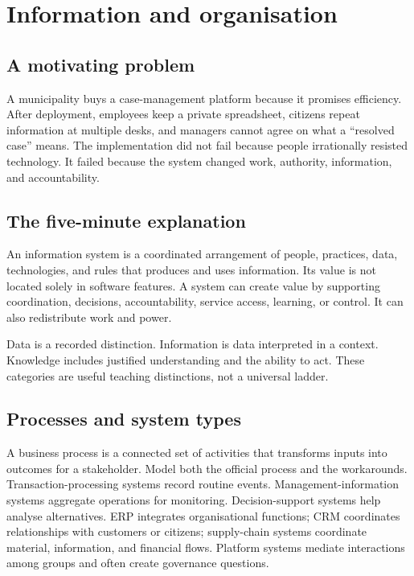 \chapter{Information and organisation}
\label{ch:information-systems}

\section{A motivating problem}
A municipality buys a case-management platform because it promises efficiency. After deployment, employees keep a private spreadsheet, citizens repeat information at multiple desks, and managers cannot agree on what a \enquote{resolved case} means. The implementation did not fail because people irrationally resisted technology. It failed because the system changed work, authority, information, and accountability.


\section{The five-minute explanation}
An information system is a coordinated arrangement of people, practices, data, technologies, and rules that produces and uses information. Its value is not located solely in software features. A system can create value by supporting coordination, decisions, accountability, service access, learning, or control. It can also redistribute work and power.

Data is a recorded distinction. Information is data interpreted in a context. Knowledge includes justified understanding and the ability to act. These categories are useful teaching distinctions, not a universal ladder.

\section{Processes and system types}
A business process is a connected set of activities that transforms inputs into outcomes for a stakeholder. Model both the official process and the workarounds. Transaction-processing systems record routine events. Management-information systems aggregate operations for monitoring. Decision-support systems help analyse alternatives. ERP integrates organisational functions; CRM coordinates relationships with customers or citizens; supply-chain systems coordinate material, information, and financial flows. Platform systems mediate interactions among groups and often create governance questions.

